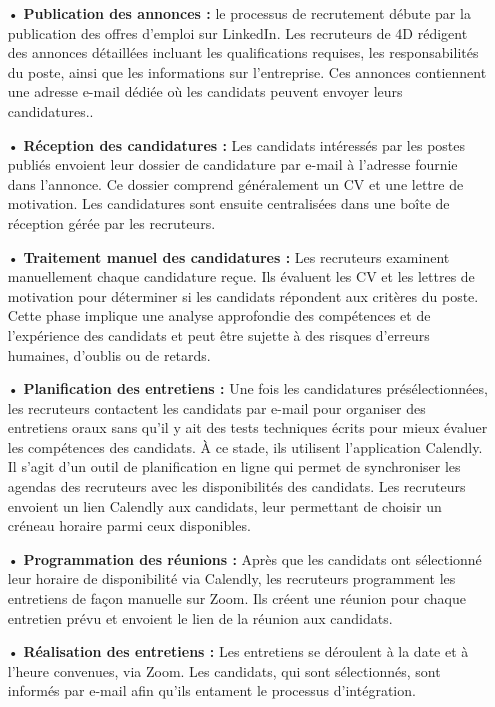 \begin{enumerate}
   \item[ • ] \textbf{Publication des annonces :} le processus de recrutement débute par la publication des offres d’emploi sur LinkedIn. Les recruteurs de 4D rédigent des annonces
   détaillées incluant les qualifications requises, les responsabilités du poste, ainsi que
   les informations sur l’entreprise. Ces annonces contiennent une adresse e-mail dédiée
   où les candidats peuvent envoyer leurs candidatures..
   \item[ • ] \textbf{Réception des candidatures :} Les candidats intéressés par les postes publiés
   envoient leur dossier de candidature par e-mail à l’adresse fournie dans l’annonce. Ce
   dossier comprend généralement un CV et une lettre de motivation. Les candidatures
   sont ensuite centralisées dans une boîte de réception gérée par les recruteurs.
   
   \item[ • ] \textbf{Traitement manuel des candidatures :} Les recruteurs examinent manuellement
   chaque candidature reçue. Ils évaluent les CV et les lettres de motivation pour
   déterminer si les candidats répondent aux critères du poste. Cette phase implique
   une analyse approfondie des compétences et de l’expérience des candidats et peut
   être sujette à des risques d’erreurs humaines, d’oublis ou de retards.
   
   \item[ • ] \textbf{Planification des entretiens :} Une fois les candidatures présélectionnées, les recruteurs contactent les candidats par e-mail pour organiser des entretiens oraux
   sans qu’il y ait des tests techniques écrits pour mieux évaluer les compétences des
   candidats. À ce stade, ils utilisent l’application Calendly. Il s’agit d’un outil de planification en ligne qui permet de synchroniser les agendas des recruteurs avec les
   disponibilités des candidats. Les recruteurs envoient un lien Calendly aux candidats,
   leur permettant de choisir un créneau horaire parmi ceux disponibles.
   \item[ • ] \textbf{Programmation des réunions :} Après que les candidats ont sélectionné leur
   horaire de disponibilité via Calendly, les recruteurs programment les entretiens de
   façon manuelle sur Zoom. Ils créent une réunion pour chaque entretien prévu et
   envoient le lien de la réunion aux candidats.
   \item[ • ] \textbf{Réalisation des entretiens :}  Les entretiens se déroulent à la date et à l’heure
   convenues, via Zoom. Les candidats, qui sont sélectionnés, sont informés par e-mail
   afin qu’ils entament le processus d’intégration.
   
\end{enumerate}

